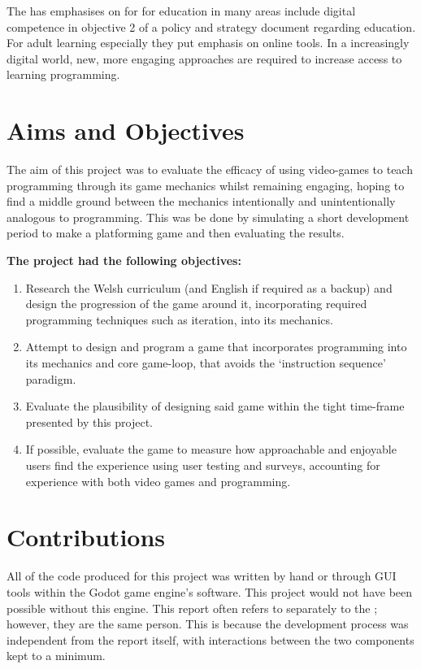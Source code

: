 The \citet{WelshGov-highStandardsAnd} has emphasises on  for  for education in many areas include digital competence in objective 2 of a policy and strategy document regarding education. For adult learning especially they put emphasis on online tools. In a increasingly digital world, new, more engaging approaches are required to increase access to learning programming.

\section{Aims and Objectives}\label{sec:introduction/aims_and_objectives}

The aim of this project was to evaluate the efficacy of using video-games to teach programming through its game mechanics whilst remaining engaging, hoping to find a middle ground between the mechanics intentionally and unintentionally analogous to programming. This was be done by simulating a short development period to make a platforming game and then evaluating the results.

\textbf{The project had the following objectives:}

\begin{enumerate}[label=\textbf{Objective \arabic*:}, leftmargin=*]\label{objectives}
    \item Research the Welsh curriculum (and English if required as a backup) and design the progression of the game around it, incorporating required programming techniques such as iteration, into its mechanics.\label{objectives/01}
    \item Attempt to design and program a game that incorporates programming into its mechanics and core game-loop, that avoids the ‘instruction sequence’ paradigm.\label{objectives/02}
    \item Evaluate the plausibility of designing said game within the tight time-frame presented by this project.\label{objectives/03}
    \item If possible, evaluate the game to measure how approachable and enjoyable users find the experience using user testing and surveys, accounting for experience with both video games and programming.\label{objectives/04}
\end{enumerate}

\section{Contributions}\label{sec:introduction/contributions}

All of the code produced for this project was written by hand or through GUI tools within the Godot game engine's software. This project would not have been possible without this engine. This report often refers to  separately to the ; however, they are the same person. This is because the development process was independent from the report itself, with interactions between the two components kept to a minimum.